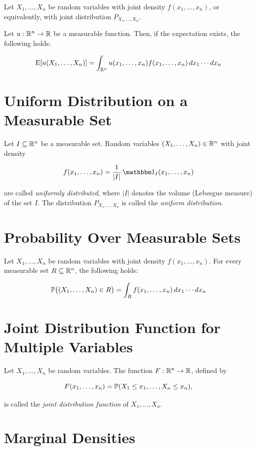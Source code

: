 Let \( X_1, \ldots, X_n \) be random variables with joint density \( f(x_1, \ldots, x_n) \),
or equivalently, with joint distribution \( P_{X_1, \ldots, X_n} \).

Let \( u : \mathbb{R}^n \to \mathbb{R} \) be a measurable function. Then, if the expectation exists, the following holds:

\[
    \mathrm{E}[u(X_1, \ldots, X_n)]
    = \int_{\mathbb{R}^n} u(x_1, \ldots, x_n) f(x_1, \ldots, x_n) \, dx_1 \cdots dx_n
\]

\section{Uniform Distribution on a Measurable Set}

Let \( I \subseteq \mathbb{R}^n \) be a measurable set. Random variables \( (X_1, \ldots, X_n) \in \mathbb{R}^n \) with joint density

\[
    f(x_1, \ldots, x_n) = \frac{1}{|I|} \, \ind_I(x_1, \ldots, x_n)
\]

are called \emph{uniformly distributed}, where \( |I| \) denotes the volume (Lebesgue measure) of the set \( I \).
The distribution \( P_{X_1, \ldots, X_n} \) is called the \emph{uniform distribution}.

\section{Probability Over Measurable Sets}

Let \( X_1, \ldots, X_n \) be random variables with joint density \( f(x_1, \ldots, x_n) \).
For every measurable set \( R \subseteq \mathbb{R}^n \), the following holds:

\[
    \mathbb{P}\big((X_1, \ldots, X_n) \in R\big)
    = \int_R f(x_1, \ldots, x_n) \, dx_1 \cdots dx_n
\]

\section{Joint Distribution Function for Multiple Variables}

Let \( X_1, \ldots, X_n \) be random variables. The function \( F : \mathbb{R}^n \to \mathbb{R} \), defined by

\[
    F(x_1, \ldots, x_n) = \mathbb{P}(X_1 \le x_1, \ldots, X_n \le x_n),
\]

is called the \emph{joint distribution function} of \( X_1, \ldots, X_n \).

\section{Marginal Densities}

